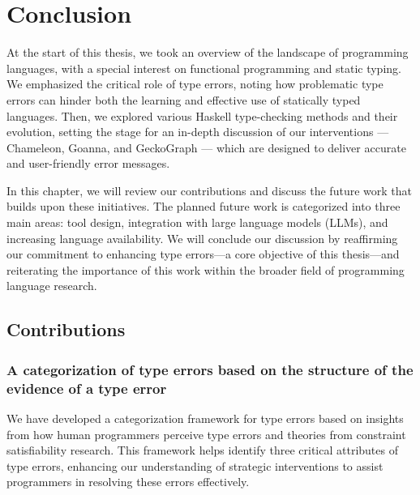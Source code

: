 

\chapter{Conclusion}

\label{chap:conclusion} 
\newcommand{\typetutor}{TypeTutor}

\graphicspath{{Figures/Conclusion}}
At the start of this thesis, we took an overview of the landscape of programming languages, with a special interest on functional programming and static typing. We emphasized the critical role of type errors, noting how problematic type errors can hinder both the learning and effective use of statically typed languages. Then, we explored various Haskell type-checking methods and their evolution, setting the stage for an in-depth discussion of our interventions --- Chameleon, Goanna, and GeckoGraph --- which are designed to deliver accurate and user-friendly error messages.

In this chapter, we will review our contributions and discuss the future work that builds upon these initiatives. The planned future work is categorized into three main areas: tool design, integration with large language models (LLMs), and increasing language availability. We will conclude our discussion by reaffirming our commitment to enhancing type errors—a core objective of this thesis—and reiterating the importance of this work within the broader field of programming language research.


\section{Contributions}


\subsection{A categorization of type errors based on the structure of the evidence of a type error}


We have developed a categorization framework for type errors based on insights from how human programmers perceive type errors and theories from constraint satisfiability research. This framework helps identify three critical attributes of type errors, enhancing our understanding of strategic interventions to assist programmers in resolving these errors effectively.

